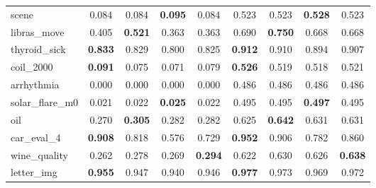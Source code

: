 \begin{figure}[ht]
\begin{tabular}{p{22mm}|*4{p{14mm}}|*4{p{14mm}}}
        scene&\multicolumn{1}{c}{0.084}&\multicolumn{1}{c}{0.084}&\multicolumn{1}{c}{\textbf{0.095}}&\multicolumn{1}{c|}{0.084}&\multicolumn{1}{c}{0.523}&\multicolumn{1}{c}{0.523}&\multicolumn{1}{c}{\textbf{0.528}}&\multicolumn{1}{c}{0.523}\\
        libras\_move&\multicolumn{1}{c}{0.405}&\multicolumn{1}{c}{\textbf{0.521}}&\multicolumn{1}{c}{0.363}&\multicolumn{1}{c|}{0.363}&\multicolumn{1}{c}{0.690}&\multicolumn{1}{c}{\textbf{0.750}}&\multicolumn{1}{c}{0.668}&\multicolumn{1}{c}{0.668}\\
        thyroid\_sick&\multicolumn{1}{c}{\textbf{0.833}}&\multicolumn{1}{c}{0.829}&\multicolumn{1}{c}{0.800}&\multicolumn{1}{c|}{0.825}&\multicolumn{1}{c}{\textbf{0.912}}&\multicolumn{1}{c}{0.910}&\multicolumn{1}{c}{0.894}&\multicolumn{1}{c}{0.907}\\
        coil\_2000&\multicolumn{1}{c}{\textbf{0.091}}&\multicolumn{1}{c}{0.075}&\multicolumn{1}{c}{0.071}&\multicolumn{1}{c|}{0.079}&\multicolumn{1}{c}{\textbf{0.526}}&\multicolumn{1}{c}{0.519}&\multicolumn{1}{c}{0.518}&\multicolumn{1}{c}{0.521}\\
        arrhythmia&\multicolumn{1}{c}{0.000}&\multicolumn{1}{c}{0.000}&\multicolumn{1}{c}{0.000}&\multicolumn{1}{c|}{0.000}&\multicolumn{1}{c}{0.486}&\multicolumn{1}{c}{0.486}&\multicolumn{1}{c}{0.486}&\multicolumn{1}{c}{0.486}\\
        solar\_flare\_m0&\multicolumn{1}{c}{0.021}&\multicolumn{1}{c}{0.022}&\multicolumn{1}{c}{\textbf{0.025}}&\multicolumn{1}{c|}{0.022}&\multicolumn{1}{c}{0.495}&\multicolumn{1}{c}{0.495}&\multicolumn{1}{c}{\textbf{0.497}}&\multicolumn{1}{c}{0.495}\\
        oil&\multicolumn{1}{c}{0.270}&\multicolumn{1}{c}{\textbf{0.305}}&\multicolumn{1}{c}{0.282}&\multicolumn{1}{c|}{0.282}&\multicolumn{1}{c}{0.625}&\multicolumn{1}{c}{\textbf{0.642}}&\multicolumn{1}{c}{0.631}&\multicolumn{1}{c}{0.631}\\
        car\_eval\_4&\multicolumn{1}{c}{\textbf{0.908}}&\multicolumn{1}{c}{0.818}&\multicolumn{1}{c}{0.576}&\multicolumn{1}{c|}{0.729}&\multicolumn{1}{c}{\textbf{0.952}}&\multicolumn{1}{c}{0.906}&\multicolumn{1}{c}{0.782}&\multicolumn{1}{c}{0.860}\\
        wine\_quality&\multicolumn{1}{c}{0.262}&\multicolumn{1}{c}{0.278}&\multicolumn{1}{c}{0.269}&\multicolumn{1}{c|}{\textbf{0.294}}&\multicolumn{1}{c}{0.622}&\multicolumn{1}{c}{0.630}&\multicolumn{1}{c}{0.626}&\multicolumn{1}{c}{\textbf{0.638}}\\
        letter\_img&\multicolumn{1}{c}{\textbf{0.955}}&\multicolumn{1}{c}{0.947}&\multicolumn{1}{c}{0.940}&\multicolumn{1}{c|}{0.946}&\multicolumn{1}{c}{\textbf{0.977}}&\multicolumn{1}{c}{0.973}&\multicolumn{1}{c}{0.969}&\multicolumn{1}{c}{0.972}\\

\end{tabular}
\end{figure}
